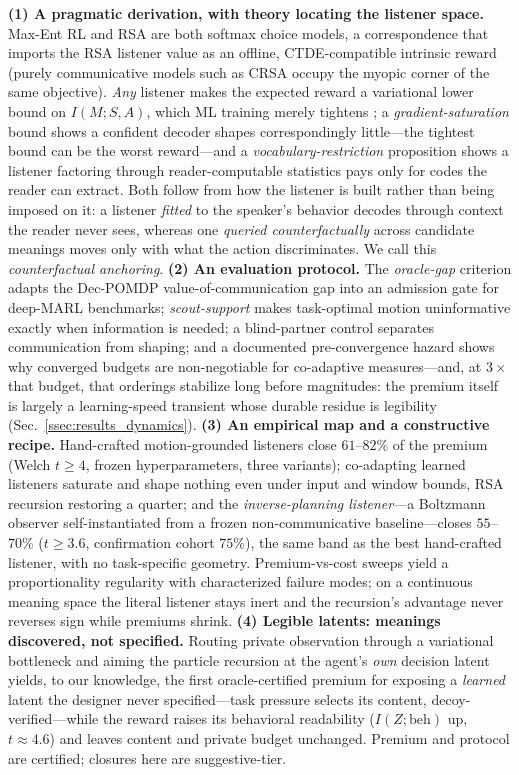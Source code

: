 \documentclass[sigconf,review,anonymous]{acmart}
\begin{document}
\textbf{(1) A pragmatic derivation, with theory locating the listener space.} Max-Ent RL and RSA are both softmax choice models, a correspondence that imports the RSA listener value as an offline, CTDE-compatible intrinsic reward (purely communicative models such as CRSA \cite{estienne2025collaborative} occupy the myopic corner of the same objective). \emph{Any} listener makes the expected reward a variational lower bound on $I(M;S,A)$, which ML training merely tightens \cite{strouse2018learning,eysenbach2019diversity}; a \emph{gradient-saturation} bound shows a confident decoder shapes correspondingly little---the tightest bound can be the worst reward---and a \emph{vocabulary-restriction} proposition shows a listener factoring through reader-computable statistics pays only for codes the reader can extract. Both follow from how the listener is built rather than being imposed on it: a listener \emph{fitted} to the speaker's behavior decodes through context the reader never sees, whereas one \emph{queried counterfactually} across candidate meanings moves only with what the action discriminates. We call this \emph{counterfactual anchoring}. \textbf{(2) An evaluation protocol.} The \emph{oracle-gap} criterion adapts the Dec-POMDP value-of-communication gap \cite{pynadath2002communicative,goldman2003optimizing,oliehoek2016concise} into an admission gate for deep-MARL benchmarks; \emph{scout-support} makes task-optimal motion uninformative exactly when information is needed; a blind-partner control separates communication from shaping; and a documented pre-convergence hazard shows why converged budgets are non-negotiable for co-adaptive measures---and, at $3\times$ that budget, that orderings stabilize long before magnitudes: the premium itself is largely a learning-speed transient whose durable residue is legibility (Sec.~\ref{ssec:results_dynamics}). \textbf{(3) An empirical map and a constructive recipe.} Hand-crafted motion-grounded listeners close $61$--$82\%$ of the premium (Welch $t\ge4$, frozen hyperparameters, three variants); co-adapting learned listeners saturate and shape nothing even under input and window bounds, RSA recursion restoring a quarter; and the \emph{inverse-planning listener}---a Boltzmann observer self-instantiated from a frozen non-communicative baseline---closes $55$--$70\%$ ($t\ge3.6$, confirmation cohort $75\%$), the same band as the best hand-crafted listener, with no task-specific geometry. Premium-vs-cost sweeps yield a proportionality regularity with characterized failure modes; on a continuous meaning space the literal listener stays inert and the recursion's advantage never reverses sign while premiums shrink. \textbf{(4) Legible latents: meanings discovered, not specified.} Routing private observation through a variational bottleneck and aiming the particle recursion at the agent's \emph{own} decision latent yields, to our knowledge, the first oracle-certified premium for exposing a \emph{learned} latent the designer never specified---task pressure selects its content, decoy-verified---while the reward raises its behavioral readability ($I(Z;\text{beh})$ up, $t{\approx}4.6$) and leaves content and private budget unchanged. Premium and protocol are certified; closures here are suggestive-tier.
\end{document}
